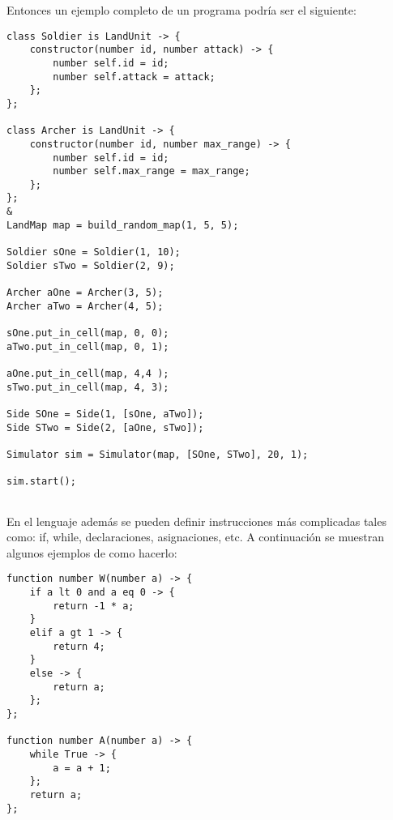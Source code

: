 Entonces un ejemplo completo de un programa podr\'ia ser el siguiente:

\begin{verbatim}
class Soldier is LandUnit -> {
    constructor(number id, number attack) -> {
        number self.id = id;
        number self.attack = attack;
    };
};

class Archer is LandUnit -> {
    constructor(number id, number max_range) -> {
        number self.id = id;
        number self.max_range = max_range;
    };
};
&
LandMap map = build_random_map(1, 5, 5);

Soldier sOne = Soldier(1, 10);
Soldier sTwo = Soldier(2, 9);

Archer aOne = Archer(3, 5);
Archer aTwo = Archer(4, 5);

sOne.put_in_cell(map, 0, 0);
aTwo.put_in_cell(map, 0, 1);

aOne.put_in_cell(map, 4,4 );
sTwo.put_in_cell(map, 4, 3);

Side SOne = Side(1, [sOne, aTwo]);
Side STwo = Side(2, [aOne, sTwo]);

Simulator sim = Simulator(map, [SOne, STwo], 20, 1);

sim.start();
	
\end{verbatim}

En el lenguaje adem\'as se pueden definir instrucciones m\'as complicadas tales como: if, while, declaraciones, asignaciones, etc. A continuaci\'on se muestran algunos ejemplos de como hacerlo:

\begin{verbatim}
function number W(number a) -> { 
    if a lt 0 and a eq 0 -> { 
        return -1 * a;  
    } 
    elif a gt 1 -> {
        return 4;
    } 
    else -> { 
        return a; 
    }; 
};

function number A(number a) -> { 
    while True -> {
        a = a + 1;
    }; 
    return a;
};
\end{verbatim} 


